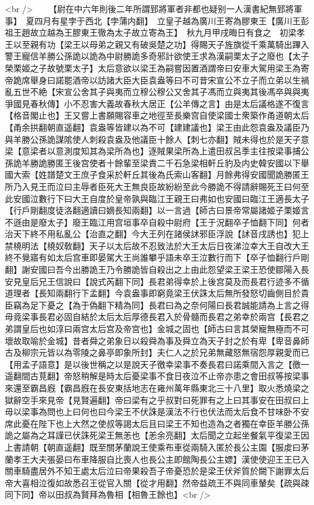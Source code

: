 <br />
　　【尉在中六年則後二年所謂郅將軍者非都也疑别一人漢書紀無郅將軍事】　夏四月有星孛于西北【孛蒲内翻】　立皇子越為廣川王寄為膠東王【廣川王彭祖王趙故立越為王膠東王徹為太子故立寄為王】　秋九月甲戌晦日有食之　初梁孝王以至親有功【梁王以母弟之親又有破吳楚之功】得賜天子旌旗從千乘萬騎出蹕入警王寵信羊勝公孫詭以詭為中尉勝詭多奇邪計欲使王求為漢嗣栗太子之廢也【太子榮栗姬之子故號栗太子】太后意欲以梁王為嗣嘗因置酒謂帝曰安車大駕用梁王為寄帝跪席舉身曰諾罷酒帝以訪諸大臣大臣袁盎等曰不可昔宋宣公不立子而立弟以生禍亂五世不絶【宋宣公舍其子與夷而立穆公穆公又舍其子馮而立與夷其後馮卒與與夷爭國見春秋傳】小不忍害大義故春秋大居正【公羊傳之言】由是太后議格遂不復言【格音閣止也】王又嘗上書願賜容車之地徑至長樂宫自使梁國士衆築作甬道朝太后【甬余拱翻朝直遥翻】袁盎等皆建以為不可【建建議也】梁王由此怨袁盎及議臣乃與羊勝公孫詭謀隂使人刺殺袁盎及他議臣十餘人【刺七亦翻】賊未得也於是天子意梁【意梁者以意測度知其為梁所為也】逐賊果梁所為上遣田叔呂季主往按梁事捕公孫詭羊勝詭勝匿王後宫使者十餘輩至梁責二千石急梁相軒丘豹及内史韓安國以下舉國大索【姓譜楚文王庶子食采於軒丘其後為氏索山客翻】月餘弗得安國聞詭勝匿王所乃入見王而泣曰主辱者臣死大王無良臣故紛紛至此今勝詭不得請辭賜死王曰何至此安國泣數行下曰大王自度於皇帝孰與臨江王親王曰弗如也安國曰臨江王適長太子【行戶剛翻度徒洛翻適讀曰嫡長知兩翻】以一言過【師古曰景帝常屬諸姬子栗姬言不遜由是廢太子】廢王臨江用宫垣事卒自殺中尉府【王于況翻卒子恤翻下同】何者治天下終不用私亂公【治直之翻】今大王列在諸侯訹邪臣浮說【訹音戌誘也】犯上禁橈明法【橈奴敎翻】天子以太后故不忍致法於大王太后日夜涕泣幸大王自改大王終不覺寤有如太后宫車即晏駕大王尚誰攀乎語未卒王泣數行而下【卒子恤翻行戶剛翻】謝安國曰吾今出勝詭王乃令勝詭皆自殺出之上由此怨望梁王梁王恐使鄒陽入長安見皇后兄王信說曰【說式芮翻下同】長君弟得幸於上後宫莫及而長君行迹多不循道理者【長知兩翻行下孟翻】今袁盎事即窮竟梁王伏誅太后無所發怒切齒側目於貴臣竊為足下憂之【為于偽翻下精為同】長君曰為之奈何陽曰長君誠能請為上言之得毋竟梁事長君必固自結於太后太后厚德長君入於骨髓而長君之弟幸於兩宫【長君之弟謂皇后也如淳曰兩宫太后宫及帝宫也】金城之固也【師古曰言其榮寵無極而不可壞故取喻於金城】昔者舜之弟象日以殺舜為事及舜立為天子封之於有卑【卑音鼻師古及柳宗元皆以為零陵之鼻亭即象所封】夫仁人之於兄弟無藏怒無宿怨厚親愛而已【用孟子語意】是以後世稱之以是說天子徼幸梁事不奏長君曰諾乘間入言之【徼一遥翻間古莧翻】帝怒稍解是時太后憂梁事不食日夜泣不止帝亦患之會田叔等按梁事來還至霸昌廐【霸昌廐在長安東括地志在雍州萬年縣東北三十八里】取火悉燒梁之獄辭空手來見帝【見賢遍翻】帝曰梁有之乎叔對曰死罪有之上曰其事安在田叔曰上毋以梁事為問也上曰何也曰今梁王不伏誅是漢法不行也伏法而太后食不甘味卧不安席此憂在陛下也上大然之使叔等謁太后且曰梁王不知也造為之者獨在幸臣羊勝公孫詭之屬為之耳謹已伏誅死梁王無恙也【恙余亮翻】太后聞之立起坐餐氣平復梁王因上書請朝【朝直遥翻】既至關茅蘭說王使乘布車從兩騎入匿於長公主園【服䖍曰茅蘭孝王大夫張晏曰布車降服自比喪人也長公主即館陶長公主嫖】漢使使迎王王已入關車騎盡居外不知王處太后泣曰帝果殺吾子帝憂恐於是梁王伏斧質於闕下謝罪太后帝大喜相泣復如故悉召王從官入關【從才用翻】然帝益疏王不與同車輦矣【疏與疎同下同】帝以田叔為賢拜為魯相【相魯王餘也】<br />
